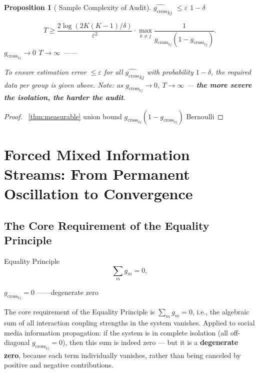 \documentclass[11pt,a4paper]{article}
\newtheorem{proposition}[theorem]{Proposition}
\theoremstyle{remark}
\newcommand{\GCoupling}{g_{\text{cross}}}
\begin{document}
\begin{proposition}[ Sample Complexity of Audit]
\label{prop:samplecomplexity}
 $\widehat{\GCoupling}_{kj}$  $\leq \varepsilon$  $1-\delta$ 

\[
T \geq \frac{2\log(2K(K-1)/\delta)}{\varepsilon^2} \cdot
\max_{k \neq j} \frac{1}{\GCoupling_{kj}(1-\GCoupling_{kj})}.
\]
 $\GCoupling_{kj} \to 0$  $T \to \infty$ ——
\textbf{}

To ensure estimation error $\leq \varepsilon$ for all $\widehat{\GCoupling}_{kj}$ with
probability $1-\delta$, the required data per group is given above.
Note: as $\GCoupling_{kj} \to 0$, $T \to \infty$ ---
\textbf{the more severe the isolation, the harder the audit}.
\end{proposition}

\begin{proof}
~\ref{thm:measurable} union bound
 $\GCoupling_{kj}(1-\GCoupling_{kj})$  Bernoulli 
\end{proof}

\section{}
\section{Forced Mixed Information Streams: From Permanent Oscillation to Convergence}

\subsection{}

\subsection{The Core Requirement of the Equality Principle}

Equality Principle
\[
\sum_{m} g_m = 0,
\]


 $\GCoupling_{kj} = 0$
——\textbf{}degenerate zero


The core requirement of the Equality Principle is $\sum_m g_m = 0$, i.e., the algebraic
sum of all interaction coupling strengths in the system vanishes. Applied to social media
information propagation: if the system is in complete isolation (all off-diagonal
$\GCoupling_{kj} = 0$), then this sum is indeed zero --- but it is a \textbf{degenerate
zero}, because each term individually vanishes, rather than being canceled by positive
and negative contributions.
\end{document}
